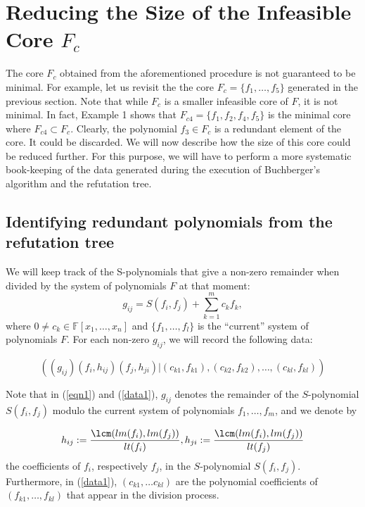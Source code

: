 \section{Reducing the Size of the Infeasible Core $F_c$}

The core $F_c$ obtained from the aforementioned procedure is not
guaranteed to be minimal. For example, let us revisit the the core
$F_c=\{f_1,\dots, f_5\}$ generated in the previous section. Note that
while $F_c$ is a smaller infeasible core of $F$, it is not minimal. In
fact, Example 1 shows that $F_{c4} =\{f_1,f_2,f_4,f_5\}$ is the
minimal core where $F_{c4} \subset F_{c}$. Clearly, the polynomial
$f_3 \in F_c$ is a redundant element of the core. It could be
discarded. We will now describe how the size of this core could be
reduced further.  For this purpose, we will have to perform a more
systematic book-keeping of the data generated during the execution of
Buchberger's algorithm and the refutation tree. 

\subsection{Identifying redundant polynomials from the refutation tree}

We will keep track of the S-polynomials that give a non-zero remainder
when divided by the system of polynomials $F$ at that moment:
\begin{equation}
\label{eqn1}
g_{ij}= S(f_i,f_j)+\displaystyle\sum_{k=1}^m c_kf_k,
\end{equation}
where $0\neq c_k\in\mathbb{F}[x_1,\ldots,x_n]$ and
$\{f_1,\ldots,f_l\}$ is the ``current'' system of polynomials
$F$. For each non-zero $g_{ij}$, we will record the following data: 

\begin{equation}
\label{data1}
((g_{ij})(f_{i},h_{ij})(f_{j},h_{ji})| (c_{k1},f_{k1}),(c_{k2},f_{k2}),\dots,(c_{kl},f_{kl}))
\end{equation}

Note that in (\ref{eqn1}) and (\ref{data1}), $g_{ij}$ denotes the
remainder of the $S$-polynomial $S(f_i,f_j)$ modulo the current system
of polynomials $f_1,\ldots,f_m$, and we denote by  

$$h_{ij}:=\displaystyle\frac{\lcm(lm(f_i),lm(f_j))}{lt(f_i)},
h_{ji}:=\displaystyle\frac{\lcm(lm(f_i),lm(f_j))}{lt(f_j)}$$ 
the coefficients of $f_i$, respectively $f_j$, in the $S$-polynomial
$S(f_i,f_j)$. Furthermore, in (\ref{data1}), $(c_{k1}, \dots c_{kl})$ are the
polynomial coefficients of $(f_{k1}, \dots,f_{kl})$ that appear in the
division process. 


